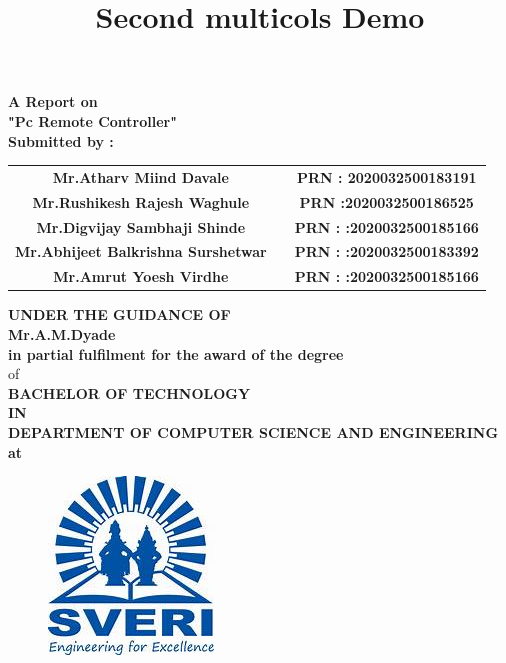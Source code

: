 \documentclass[12pt]{article}
\title{Second multicols Demo}
\begin{document}
 \begin{center}
 \large \textbf {A Report on}\\[2mm]
 \LARGE \textbf {"Pc Remote Controller"}\\[7mm]
 
 \textbf{Submitted by :}\\[2mm]
 \end{center}
 
 
 \begin{tabular}{ c c c } 
 \textbf{Mr.Atharv Miind Davale} & \hspace{1.1in} & \textbf{ PRN :  2020032500183191} \\ [1mm] 
 \textbf {Mr.Rushikesh Rajesh Waghule} & \hspace{1.1in} & \textbf{PRN :2020032500186525}\\[1mm]
 \textbf{ Mr.Digvijay Sambhaji Shinde } & \hspace{1.1in}  & \textbf{PRN : :2020032500185166}\\[1mm]
\textbf{ Mr.Abhijeet Balkrishna Surshetwar} & \hspace{1.1in}  & \textbf{PRN : :2020032500183392}\\[1mm]
\textbf{ Mr.Amrut Yoesh Virdhe} & \hspace{1.1in}  & \textbf{PRN : :2020032500185166}\\[7mm] 
\end{tabular} 
 
 
 
 \begin{center}
 \large \textbf {UNDER THE GUIDANCE OF }\\[2mm]
 \large \textbf {Mr.A.M.Dyade}\\[7mm]
 \textbf {in partial fulfilment for the award of the degree} \\[2mm] of \\[2mm]
 
 \large \textbf {BACHELOR OF TECHNOLOGY}\\[2mm]
 \textbf {IN}\\[2mm]
 \textbf {DEPARTMENT OF COMPUTER SCIENCE AND ENGINEERING}\\
 \textbf {at}
 \end{center}
 
 \begin{figure}[h]
 \centering
 \includegraphics[scale=1]{sveri2logo}
\end{figure} 
\end{document}
